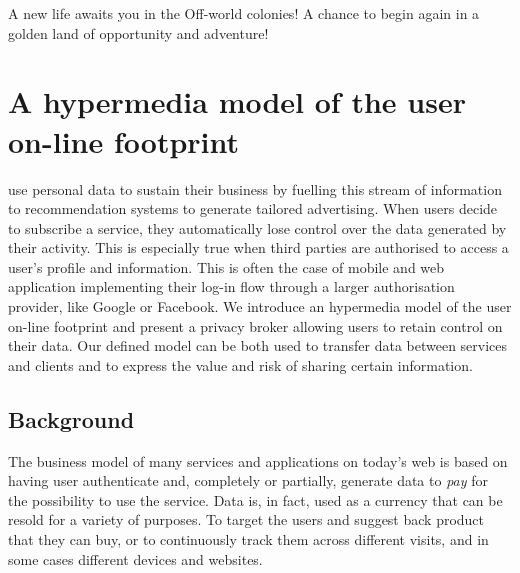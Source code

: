 \begin{savequote}[75mm]
A new life awaits you in the Off-world colonies! A chance to begin again in a golden land of opportunity and adventure!
\end{savequote}

\chapter{A hypermedia model of the user on-line footprint}

 use personal data to sustain their business by fuelling this stream of information to recommendation systems to generate tailored advertising. When users decide to subscribe a service, they automatically lose control over the data generated by their activity. This is especially true when third parties are authorised to access a user's profile and information. This is often the case of mobile and web application implementing their log-in flow through a larger authorisation provider, like Google or Facebook. We introduce an hypermedia model of the user on-line footprint and present a privacy broker allowing users to retain control on their data. Our defined model can be both used to transfer data between services and clients and to express the value and risk of sharing certain information.

\section{Background}

The business model of many services and applications on today's web is based on having user authenticate and, completely or partially, generate data to \emph{pay} for the possibility to use the service. Data is, in fact, used as a currency that can be resold for a variety of purposes. To target the users and suggest back product that they can buy, or to continuously track them across different visits, and in some cases different devices and websites.

